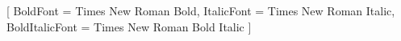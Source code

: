 

\usepackage{fontspec}
\usepackage{fontspec}
\setmainfont{Times New Roman}[
  BoldFont       = Times New Roman Bold,
  ItalicFont     = Times New Roman Italic,
  BoldItalicFont = Times New Roman Bold Italic
]
\setsansfont{Arial}
\setmonofont{Courier New}
\usepackage{microtype}

\usepackage{geometry}
\usepackage{setspace}
\usepackage{etoolbox}
\usepackage{parskip}
\usepackage{csquotes}

\usepackage{graphicx}
\usepackage{caption}
\usepackage{subcaption}
\usepackage{float}
\usepackage{tikz}

\usepackage{booktabs}
\usepackage{longtable}
\usepackage{array}
\usepackage{multirow}

\usepackage{fancyhdr}
\def\scrunningtitle{}
\usepackage{titlesec}

\usepackage{xcolor}
\usepackage{fancyvrb}
\usepackage{framed}

\usepackage{nomencl}
\makenomenclature


